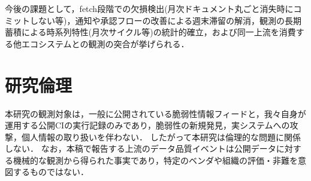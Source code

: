 \documentclass{css}
\begin{document}
今後の課題として，fetch段階での欠損検出(月次ドキュメント丸ごと消失時にコミットしない等)，通知や承認フローの改善による週末滞留の解消，観測の長期蓄積による時系列特性(月次サイクル等)の統計的確立，および同一上流を消費する他エコシステムとの観測の突合が挙げられる．




\section{研究倫理}
\label{sec:ethics}

本研究の観測対象は，一般に公開されている脆弱性情報フィードと，我々自身が運用する公開CIの実行記録のみであり，脆弱性の新規発見，実システムへの攻撃，個人情報の取り扱いを伴わない．
したがって本研究は倫理的な問題に関係しない．
なお，本稿で報告する上流のデータ品質イベントは公開データに対する機械的な観測から得られた事実であり，特定のベンダや組織の評価・非難を意図するものではない．
\end{document}
